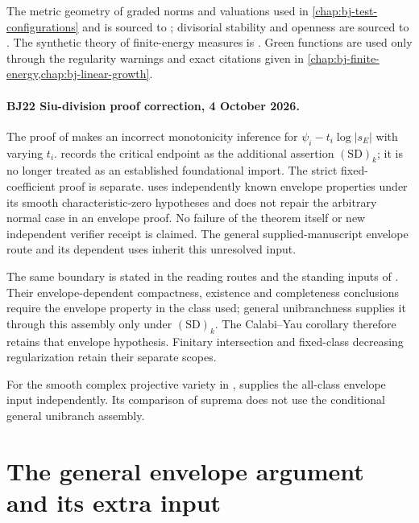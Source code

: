 The metric geometry of graded norms and valuations used in
\cref{chap:bj-test-configurations} and
 is sourced to
\cite{BJKS1}; divisorial stability and openness are
sourced to \cite{BJKS2}.  The synthetic theory of finite-energy measures is
\cite{BJ25FiniteEnergy}.  Green functions are used only through the regularity
warnings and exact citations given in
\cref{chap:bj-finite-energy,chap:bj-linear-growth}.

\paragraph{BJ22 Siu-division proof correction, 4 October 2026.}
The proof of \cite[Theorem~6.21, pp.~736--737]{BJ22} makes an incorrect
monotonicity inference for $\psi_i-t_i\log|s_E|$ with varying $t_i$.
 records the critical endpoint as the
additional assertion $\mathrm{(SD)}_k$; it is no longer treated as an
established foundational import. The strict fixed-coefficient proof is
separate. \cite[Proposition~17]{BJGreen24} uses independently known
envelope properties under its smooth characteristic-zero hypotheses and
does not repair the arbitrary normal case in an envelope proof.
No failure of the theorem itself or new independent verifier receipt is
claimed. The general supplied-manuscript envelope route and its dependent
uses inherit this unresolved input.

The same boundary is stated in the reading routes and the standing inputs
of . Their envelope-dependent
compactness, existence and completeness conclusions require the envelope
property in the class used; general unibranchness supplies it through this
assembly only under $\mathrm{(SD)}_k$. The Calabi--Yau corollary therefore
retains that envelope hypothesis. Finitary intersection and fixed-class
decreasing regularization retain their separate scopes.

For the smooth complex projective variety in
, \cite[Theorem~A]{BJ22b} supplies the
all-class envelope input independently. Its comparison of suprema does
not use the conditional general unibranch assembly.

\section{The general envelope argument and its extra input}
\label{sec:appL-envelope}

